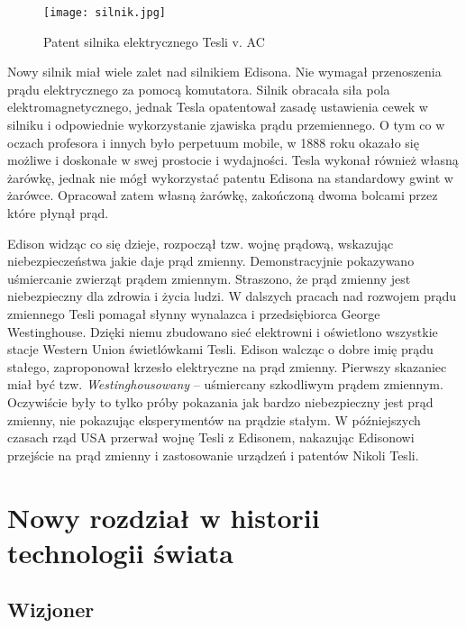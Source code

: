 \documentclass{article}
\begin{document}
\begin{large}
\begin{figure}
\vspace{+5pt}
\texttt{[image: silnik.jpg]}
\vspace{0pt}
\caption{Patent silnika elektrycznego Tesli v. AC}
\vspace{-0pt}
\end{figure}


\indent Nowy silnik miał wiele zalet nad silnikiem Edisona. Nie wymagał przenoszenia prądu elektrycznego za pomocą komutatora. Silnik obracała siła pola elektromagnetycznego, jednak Tesla opatentował zasadę ustawienia cewek w silniku i odpowiednie wykorzystanie zjawiska prądu przemiennego. O tym co w oczach profesora i innych było perpetuum mobile, w 1888 roku okazało się możliwe i doskonałe w swej prostocie i wydajności. Tesla wykonał również własną żarówkę, jednak nie mógł wykorzystać patentu Edisona na standardowy gwint w żarówce. Opracował zatem własną żarówkę, zakończoną dwoma bolcami przez które płynął prąd.

\indent Edison widząc co się dzieje, rozpoczął tzw. wojnę prądową, wskazując niebezpieczeństwa jakie daje prąd zmienny. Demonstracyjnie pokazywano uśmiercanie zwierząt prądem zmiennym. Straszono, że prąd zmienny jest niebezpieczny dla zdrowia i życia ludzi. W dalszych pracach nad rozwojem prądu zmiennego Tesli pomagał słynny wynalazca i przedsiębiorca George Westinghouse. Dzięki niemu zbudowano sieć elektrowni i oświetlono wszystkie stacje Western Union świetlówkami Tesli. Edison walcząc o dobre imię prądu stałego, zaproponował krzesło elektryczne na prąd zmienny. Pierwszy skazaniec miał być tzw. \emph{Westinghousowany} – uśmiercany szkodliwym prądem zmiennym. Oczywiście były to tylko próby pokazania jak bardzo niebezpieczny jest prąd zmienny, nie pokazując eksperymentów na prądzie stałym. W późniejszych czasach rząd USA przerwał wojnę Tesli z Edisonem, nakazując Edisonowi przejście na prąd zmienny i zastosowanie urządzeń i patentów Nikoli Tesli.

\newpage


\section{Nowy rozdział w historii technologii świata}


\subsection{Wizjoner}



\end{large}
\end{document}
